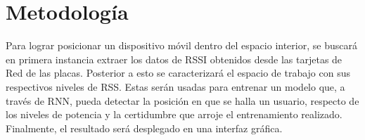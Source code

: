 \section{Metodología}

Para lograr posicionar un dispositivo móvil dentro del espacio interior, se buscará en primera instancia extraer los datos de RSSI obtenidos desde las tarjetas de Red de las placas. Posterior a esto se caracterizará el espacio de trabajo con sus respectivos niveles de RSS. Estas serán usadas para entrenar un modelo que, a través de RNN, pueda detectar la posición en que se halla un usuario, respecto de los niveles de potencia y la certidumbre que arroje el entrenamiento realizado. Finalmente, el resultado será desplegado en una interfaz gráfica.